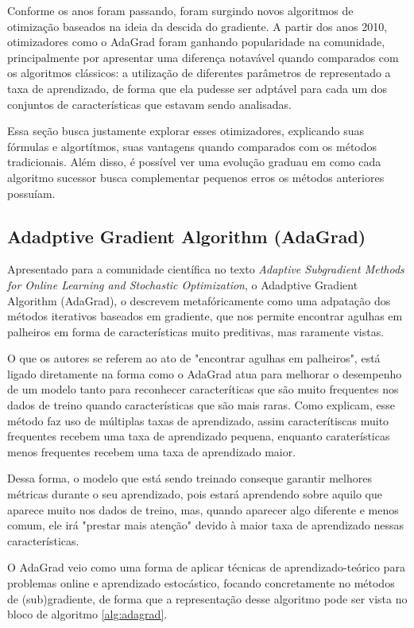 Conforme os anos foram passando, foram surgindo novos algoritmos de otimização baseados na ideia da descida do gradiente. A partir dos anos 2010, otimizadores como o AdaGrad foram ganhando popularidade na comunidade, principalmente por apresentar uma diferença notavável quando comparados com os algoritmos clássicos: a utilização de diferentes parâmetros de representado a taxa de aprendizado, de forma que ela pudesse ser adptável para cada um dos conjuntos de características que estavam sendo analisadas.

Essa seção busca justamente explorar esses otimizadores, explicando suas fórmulas e algortítmos, suas vantagens quando comparados com os métodos tradicionais. Além disso, é possível ver uma evolução graduau em como cada algoritmo sucessor busca complementar pequenos erros os métodos anteriores possuíam.

\subsection{Adadptive Gradient Algorithm (AdaGrad)}

Apresentado para a comunidade científica no texto \textit{Adaptive Subgradient Methods for Online Learning and Stochastic Optimization}, o Adadptive Gradient Algorithm (AdaGrad), \textcite{AdaGradMethod} o descrevem metafóricamente como uma adpatação dos métodos iterativos baseados em gradiente, que nos permite encontrar agulhas em palheiros em forma de características muito preditivas, mas raramente vistas.

O que os autores se referem ao ato de "encontrar agulhas em palheiros", está ligado diretamente na forma como o AdaGrad atua para melhorar o desempenho de um modelo tanto para reconhecer caracteríticas que são muito frequentes nos dados de treino quando características que são mais raras. Como \textcite{AdaGradMethod} explicam, esse método faz uso de múltiplas taxas de aprendizado, assim caracterítiscas muito frequentes recebem uma taxa de aprendizado pequena, enquanto caraterísticas menos frequentes recebem uma taxa de aprendizado maior.

Dessa forma, o modelo que está sendo treinado conseque garantir melhores métricas durante o seu aprendizado, pois estará aprendendo sobre aquilo que aparece muito nos dados de treino, mas, quando aparecer algo diferente e menos comum, ele irá "prestar mais atenção" devido à maior taxa de aprendizado nessas características.

O AdaGrad veio como uma forma de aplicar técnicas de aprendizado-teórico para problemas online e aprendizado estocástico, focando concretamente no métodos de (sub)gradiente, de forma que a representação desse algoritmo pode ser vista no bloco de algoritmo \ref{alg:adagrad}.

